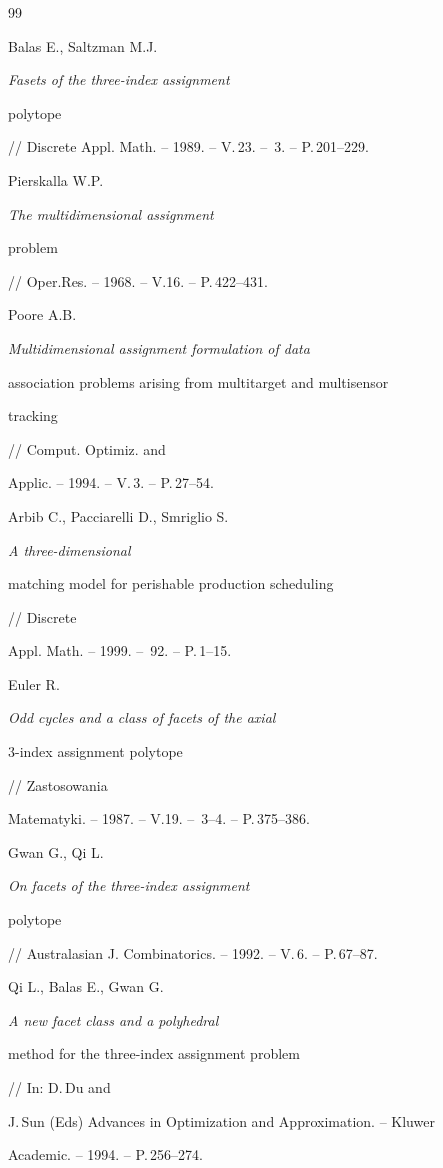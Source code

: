 \begin{thebibliography}{99}







Balas E., Saltzman M.J. {\em Fasets of the three-index assignment


polytope} // Discrete Appl. Math. -- 1989. -- V.\,23. -- \No\,3. -- P.\,201--229.




Pierskalla W.P. {\em The multidimensional assignment


problem} // Oper.Res. -- 1968. -- V.16. -- P.\,422--431.




Poore A.B. {\em Multidimensional assignment formulation of data


association problems arising from multitarget and multisensor


tracking} // Comput. Optimiz. and


Applic. -- 1994. -- V.\,3. -- P.\,27--54.




Arbib C., Pacciarelli D., Smriglio S. {\em A three-dimensional


matching model for perishable production scheduling} // Discrete


Appl. Math. -- 1999. -- \No\,92. -- P.\,1--15.




Euler R. {\em Odd cycles and a class of facets of the axial


$3$-index assignment polytope} // Zastosowania


Matematyki. -- 1987. -- V.19. -- \No\,3--4. -- P.\,375--386.




Gwan G., Qi L. {\em On facets of the three-index assignment


polytope} // Australasian J. Combinatorics. -- 1992. -- V.\,6. -- P.\,67--87.




Qi L., Balas E., Gwan G. {\em A new facet class and a polyhedral


method for the three-index assignment problem} // In: D.\,Du and


J.\,Sun (Eds) Advances in Optimization and Approximation. -- Kluwer


Academic. -- 1994. -- P.\,256--274.





\end{thebibliography}
